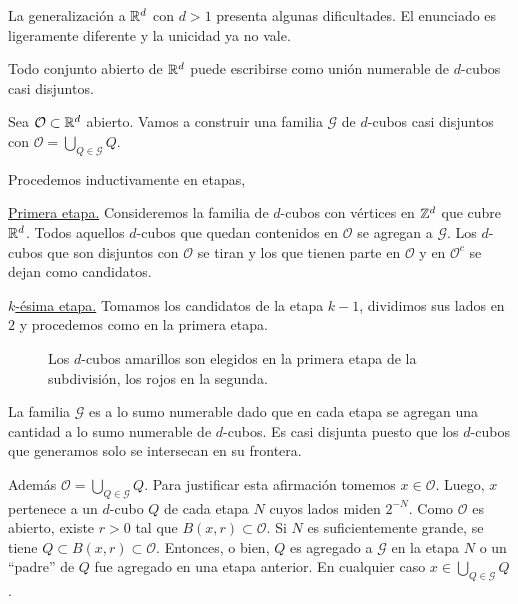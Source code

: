  


La generalizaci\'on a $\mathbb{R}^d$ con $d>1$ presenta algunas dificultades. El enunciado es ligeramente diferente y la unicidad ya no vale. 

\begin{teorema}{}
Todo conjunto abierto de $\mathbb{R}^d$ puede escribirse como uni\'on numerable de $d$-cubos casi disjuntos.
\end{teorema}

\begin{demo}
Sea $\mathcal{O}\subset \mathbb{R}^d$ abierto. Vamos a construir una familia $\mathcal{G}$ de $d$-cubos casi disjuntos con $\mathcal{O}=\bigcup\limits_{Q \in \mathcal{G}} Q$.

Procedemos inductivamente en etapas, 

\noindent\underline{Primera etapa.}
Consideremos la familia de $d$-cubos con v\'ertices en $\mathbb{Z}^d$ que cubre $\mathbb{R}^d$.  Todos aquellos $d$-cubos que quedan contenidos en $\mathcal{O}$ se agregan a $\mathcal{G}$.  Los  $d$-cubos  que son disjuntos con $\mathcal{O}$ se tiran y los que tienen parte en $\mathcal{O}$ y en $\mathcal{O}^c$ se dejan  como candidatos.

\noindent\underline{$k$-\'esima  etapa.} Tomamos los candidatos de la etapa $k-1$, dividimos sus lados en $2$ y procedemos como en la primera etapa. 

\begin{figure}[H]
 \begin{center}
  \def\svgwidth{8cm}

 \end{center}
 \caption{Los $d$-cubos amarillos son elegidos en la primera etapa de la subdivisión, los rojos en la segunda.  }\label{fig:descomp}
\end{figure}
 

La familia $\mathcal{G}$ es a lo sumo numerable dado que en cada etapa se agregan una cantidad a lo sumo numerable de $d$-cubos. Es casi disjunta puesto que los $d$-cubos que generamos solo se intersecan en su frontera. 

Además $\mathcal{O}=\bigcup\limits_{Q \in \mathcal{G}} Q$. Para justificar esta afirmación tomemos  $x\in \mathcal{O}$. Luego,  $x$ pertenece a un $d$-cubo $Q$ de cada etapa $N$ cuyos lados miden $2^{-N}$. Como $\mathcal{O}$ es abierto, existe $r>0$ tal que $B(x,r)\subset\mathcal{O}$. Si $N$ es suficientemente grande, se tiene  $Q\subset B(x,r)\subset \mathcal{O}$. Entonces, o bien, $Q$ es agregado a $\mathcal{G}$ en la etapa $N$ o un ``padre'' de $Q$ fue agregado en una etapa anterior. En cualquier caso $x\in \bigcup\limits_{Q \in \mathcal{G}} Q$.
 \end{demo}
 
